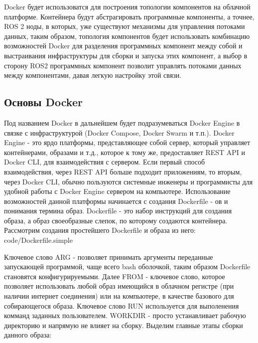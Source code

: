 \documentclass[a4paper, 14pt]{extreport}
\begin{document}
\par\noindent Docker будет использоватся для построения топологии компонентов на облачной платформе. Контейнера будут абстрагировать
 программные компоненты, а точнее, ROS 2 ноды, в которых, уже существуют механизмы для управления потоками данных, таким образом,
 топология компонентов будет использовать комбинацию возможностей Docker для разделения программных компонент между собой и
 выстраивания инфраструктуры для сборки и запуска этих компонент, а выбор в сторону ROS2 программных компонент позволит управлять
 потоками данных между компонентами, давая легкую настройку этой связи.
\subsection{Основы Docker}
\par\noindent Под названием Docker в дальнейшем будет подразумеваться Docker Engine в связке с инфраструктурой (Docker Compose, 
 Docker Swarm и т.п.). Docker Engine - это ярдо платформы, представляющее собой сервер, который управляет контейнерами, образами и т.д.,
 которое к тому же, предоставляет REST API и Docker CLI, для взаимодействия с сервером. Если первый способ взаимодействия, через 
 REST API больше подходит приложениям, то вторым, через Docker CLI, обычно пользуются системные инженеры и программисты для удобной
 работы с Docker Engine сервером на компьютере. Использование возможностей данной платформы начинается с создания Dockerfile - ов и 
 понимания термина образ. Dockerfile - это набор инструкций для создания образа, а образ своеобразные слепок, по которому создаются
 контейнера. Рассмотрим создания простейшего Dockerfile и образа из него:
 {code/Dockerfile.simple}
\par\noindent Ключевое слово ARG - позволяет принимать аргументы переданные запускающей программой, чаще всего bash оболочкой, таким
 образом Dockerfile становятся конфигурируемыми. Далее FROM - ключевое слово, которое позволяет использовать любой образ имеющийся в 
 облачном регистре (при наличии интернет соединения) или на компьютере, в качестве базового для собирающегося образа. Ключевое слово
 RUN используется для выполенения комманд заданных пользователем. WORKDIR - просто устанавливает рабочую директорию и напрямую не 
 влияет на сборку. Выделим главные этапы сборки данного образа:
\end{document}
